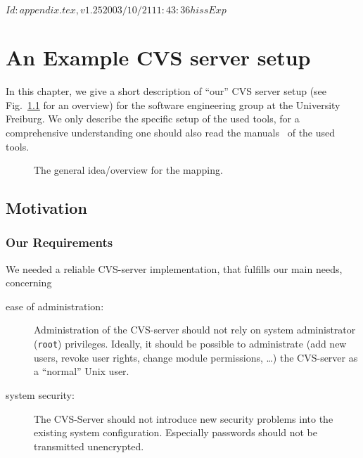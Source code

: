 \rcsInfo $Id: appendix.tex,v 1.25 2003/10/21 11:43:36 hiss Exp $

\chapter{An Example CVS server setup}\label{cha:textsfs-repos}
In this chapter, we give a short description of ``our'' CVS server
setup (see Fig.~\ref{fig:mapping} for an overview) for the software 
engineering group at the University
Freiburg. We only describe the specific setup of the used tools, for a 
comprehensive understanding one should also read the manuals~\cite{vogt:cvsauth:2001,cederqvist.ea:cvs:2000, miller:sudo:2002, frisch:administration:1995} of the used tools.
\begin{figure}
  \center
    \scalebox{0.4}{}
    \caption{The general idea/overview for the mapping.\label{fig:mapping}}
\end{figure}

\section{Motivation}
\subsection{Our Requirements}
We needed a reliable CVS-server implementation,
that fulfills our main needs, concerning
\begin{description}
\item[ease of administration:] Administration of the CVS-server should not rely
  on system administrator (\texttt{root}) privileges. Ideally, it should be possible to 
  administrate (add new users, revoke user rights, change module
  permissions,  \ldots) the CVS-server
  as a ``normal'' Unix user.
\item[system security:] The CVS-Server should not introduce new security problems into
  the existing system configuration. Especially passwords should not be
  transmitted unencrypted. 
\end{description}
